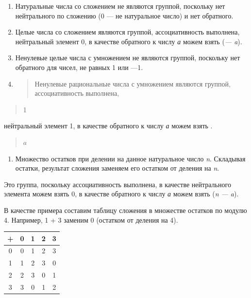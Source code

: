 \documentclass[12pt]{article}
\begin{document}
\begin{enumerate}
    \item
          Натуральные числа со сложением не являются группой, поскольку нет
          нейтрального по сложению (0 --- не натуральное число) и нет обратного.
    \item
          Целые числа со сложением являются группой, ассоциативность выполнена,
          нейтральный элемент 0, в качестве обратного к числу \emph{а} можем
          взять (\emph{--- a}).
    \item
          Ненулевые целые числа с умножением не являются группой, поскольку нет
          обратного для чисел, не равных 1 или ---1.
    \item
          \begin{quote}
              Ненулевые рациональные числа с умножением являются группой,
              ассоциативность выполнена,
          \end{quote}
\end{enumerate}

\begin{quote}
    1
\end{quote}

нейтральный элемент 1, в качестве обратного к числу \emph{а} можем взять
.

\begin{quote}
    $a$
\end{quote}

\begin{enumerate}
    \def\labelenumi{\arabic{enumi}.}
    \item
          Множество остатков при делении на данное натуральное число \emph{n}.
          Складывая остатки, результат сложения заменяем его остатком от деления
          на \emph{n}.
\end{enumerate}

Это группа, поскольку ассоциативность выполнена, в качестве нейтрального
элемента можем взять 0, в качестве обратного к числу \emph{а} можем
взять (\emph{n --- a}).

В качестве примера составим таблицу сложения в множестве остатков по
модулю 4. Например, 1 + 3 заменим 0 (остатком от деления на 4).

\begin{tabular}{|c|c|c|c|c|}
    \hline
    + & 0 & 1 & 2 & 3 \\
    \hline
    0 & 0 & 1 & 2 & 3 \\
    \hline
    1 & 1 & 2 & 3 & 0 \\
    \hline
    2 & 2 & 3 & 0 & 1 \\
    \hline
    3 & 3 & 0 & 1 & 2 \\
    \hline
\end{tabular}
\end{document}

